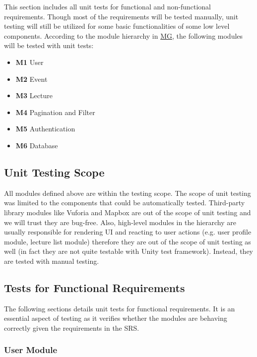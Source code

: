 \documentclass[12pt, titlepage]{article}
\begin{document}
This section includes all unit tests for functional and non-functional requirements. Though most of the requirements will be tested manually, unit testing will still be utilized for some basic functionalities of some low level components. According to the module hierarchy in \href{https://github.com/beatlepie/4G06CapstoneProjectTeam2/blob/main/docs/Design/SoftArchitecture/MG.pdf}{MG}, the following modules will be tested with unit tests:
\begin{itemize}
	\item \textbf{M1} User
	\item \textbf{M2} Event
	\item \textbf{M3} Lecture
	\item \textbf{M4} Pagination and Filter
	\item \textbf{M5} Authentication
	\item \textbf{M6} Database
\end{itemize}

\subsection{Unit Testing Scope}

All modules defined above are within the testing scope.  The scope of unit testing was limited to the components that could be automatically tested. Third-party library modules like Vuforia and Mapbox are out of the scope of unit testing and we will trust they are bug-free. Also, high-level modules in the hierarchy are usually responsible for rendering UI and reacting to user actions (e.g. user profile module, lecture list module) therefore they are out of the scope of unit testing as well (in fact they are not quite testable with Unity test framework). Instead, they are tested with manual testing.

\subsection{Tests for Functional Requirements}

The following sections details unit tests for functional requirements. It is an essential aspect of testing as it verifies whether the modules are behaving
correctly given the requirements in the SRS.

\subsubsection{User Module}
\end{document}
